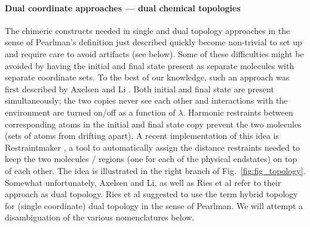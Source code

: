 \documentclass[9pt,bestpractices]{livecoms}
\newcommand{\sbnote}[1]{%
  {\bfseries{}[SB: }%
  {\textcolor{blue}{#1}}{\bfseries{}]}
}
\begin{document}
\paragraph{Dual coordinate approaches --- dual chemical topologies}

The chimeric constructs needed in single and dual topology approaches in the sense of Pearlman’s definition just described quickly become non-trivial to set up and require care to avoid artifacts (see below). %
Some of these difficulties might be avoided by having the initial and final state present as separate molecules with separate coordinate sets. To the best of our knowledge, such an approach was first described by Axelsen and Li \cite{Axelsen_1998}. Both initial and final state are present simultaneously; the two copies never see each other and interactions with the environment are turned on/off as a function of $\lambda$. Harmonic restraints between corresponding atoms in the initial and final state copy prevent the two molecules (sets of atoms from drifting apart). %
A recent implementation of this idea is Restraintmaker \cite{Ries_2022}, a tool to automatically assign the distance restraints needed to keep the two molecules / regions (one for each of the physical endstates) on top of each other. The idea is illustrated in the right branch of Fig.~\ref{fig:fig_topology}.  Somewhat unfortunately, Axelsen and Li, as well as Ries et al refer to their approach as dual topology. Ries et al suggested to use the term hybrid topology for (single coordinate) dual topology in the sense of Pearlman. We will attempt a disambiguation of the various nomenclatures below.
\end{document}

